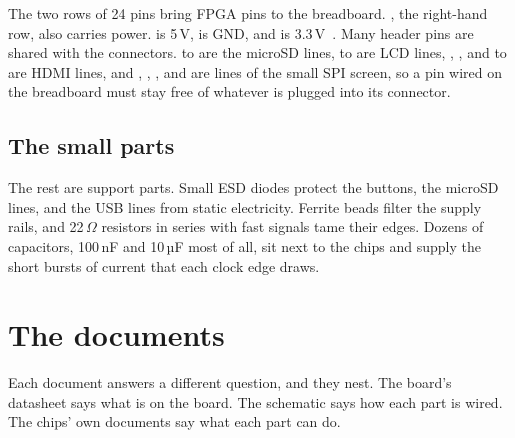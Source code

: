 \documentclass[11pt,a4paper]{article}
\begin{document}
The two rows of 24 pins bring FPGA pins to the breadboard. , the right-hand row, also carries power.  is 5\,V,  is GND, and  is 3.3\,V~\cite[p.~2]{schematic}. Many header pins are shared with the connectors.  to  are the microSD lines,  to  are LCD lines, , , and  to  are HDMI lines, and , , , and  are lines of the small SPI screen, so a pin wired on the breadboard must stay free of whatever is plugged into its connector.

\subsection*{The small parts}

The rest are support parts. Small ESD diodes protect the buttons, the microSD lines, and the USB lines from static electricity. Ferrite beads filter the supply rails, and 22\,$\Omega$ resistors in series with fast signals tame their edges. Dozens of capacitors, 100\,nF and 10\,µF most of all, sit next to the chips and supply the short bursts of current that each clock edge draws.

\section*{The documents}

Each document answers a different question, and they nest. The board’s datasheet says what is on the board. The schematic says how each part is wired. The chips’ own documents say what each part can do.
\end{document}
